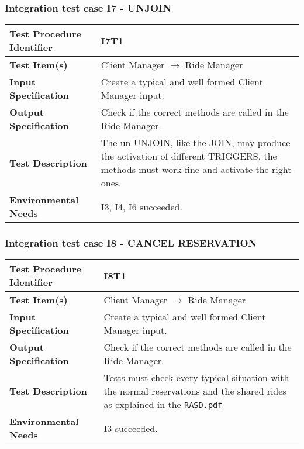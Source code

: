 \subsubsection{Integration test case I7 - UNJOIN  }
 \begin{tabular}{l p{}}
    \hline
    \textbf{Test Procedure Identifier} & I7T1  \\
    \hline
    \textbf{Test Item(s)} & Client Manager  $\rightarrow$ Ride Manager \\
    \hline
    \textbf{Input Specification} &  Create a typical and well formed Client Manager input. \\
    \hline
    \textbf{Output Specification} & Check if the correct methods are called in the Ride Manager. \\
    \hline
    \textbf{Test Description} & The un UNJOIN, like the JOIN, may produce the activation of different TRIGGERS, the methods must work fine and activate the right ones. \\
    \hline
    \textbf{Environmental Needs} &  I3, I4, I6 succeeded.\\
    \hline
    \end{tabular}
\hfill \newline \newline  
\subsubsection{Integration test case I8 - CANCEL RESERVATION }
 \begin{tabular}{l p{}}
    \hline
    \textbf{Test Procedure Identifier} & I8T1 \\
    \hline
    \textbf{Test Item(s)} & Client Manager  $\rightarrow$ Ride Manager \\
    \hline
    \textbf{Input Specification} &  Create a typical and well formed Client Manager input. \\
    \hline
    \textbf{Output Specification} & Check if the correct methods are called in the Ride Manager. \\
    \hline
    \textbf{Test Description} & Tests must check every typical situation with the normal reservations and the shared rides as explained in the \texttt{RASD.pdf}  \\
    \hline
    \textbf{Environmental Needs} & I3 succeeded. \\
    \hline
\end{tabular}
\hfill \newline \newline  
